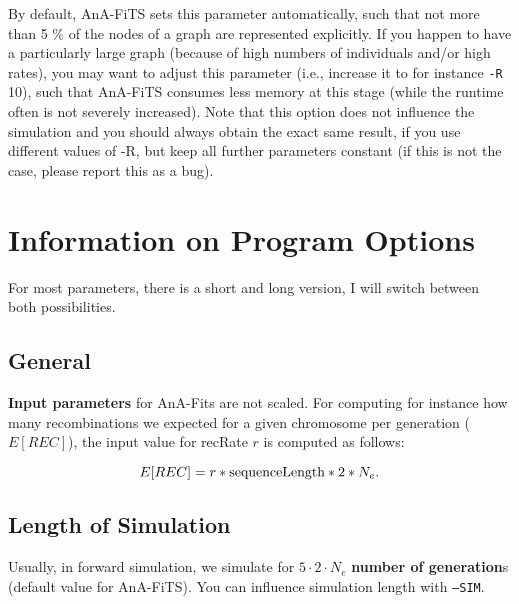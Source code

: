\documentclass{scrartcl}
\newcommand{\prog}[1]{\texttt{#1}}
\begin{document}
By default, AnA-FiTS sets this parameter automatically, such that not
more than 5 \% of the nodes of a graph are represented explicitly. If
you happen to have a particularly large graph (because of high numbers
of individuals and/or high rates), you may want to adjust this
parameter (i.e., increase it to for instance \prog{-R} 10), such that
AnA-FiTS consumes less memory at this stage (while the runtime often
is not severely increased). Note that this option does not influence
the simulation and you should always obtain the exact same result, if
you use different values of -R, but keep all further parameters
constant (if this is not the case, please report this as a bug). 



\section{Information on Program Options}
\label{sec:walk-through-options}

For most parameters, there is a short and long version, I will switch
between both possibilities. 

\subsection{General}
\label{sec:general}
\textbf{Input parameters} for AnA-Fits are not scaled.  For computing for
instance how many recombinations we expected for a given chromosome
per generation ($E[REC]$), the input value for recRate $r$ is
computed as follows: 

\begin{equation*}
  \label{eq:1}
  E[REC] = r * \textnormal{sequenceLength} * 2 * N_e. 
\end{equation*}


\subsection{Length of Simulation}
\label{sec:simulation-length}
Usually, in forward simulation, we simulate for $5 \cdot 2 \cdot N_e$
\textbf{number of generation}s (default value for AnA-FiTS). You can
influence simulation length with \prog{--SIM}.
\end{document}
